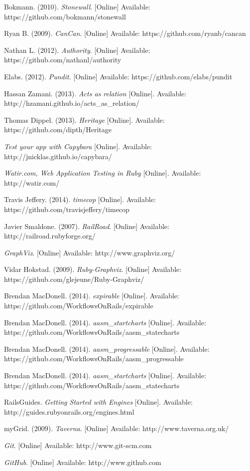 \begin{thebibliography}{99}
Bokmann. (2010). \textit{Stonewall}. [Online] Available: https://github.com/bokmann/stonewall

Ryan B. (2009). \textit{CanCan}. [Online] Available: https://github.com/ryanb/cancan

Nathan L. (2012). \textit{Authority}. [Online] Available: https://github.com/nathanl/authority

Elabs. (2012). \textit{Pundit}. [Online] Available: https://github.com/elabs/pundit

Hassan Zamani. (2013). \textit{Acts as relation} [Online]. Available: http://hzamani.github.io/acts\_as\_relation/

Thomas Dippel. (2013). \textit{Heritage} [Online]. Available: https://github.com/dipth/Heritage

\textit{Test your app with Capybara} [Online]. Available: http://jnicklas.github.io/capybara/

\textit{Watir.com, Web Application Testing in Ruby} [Online]. Available: http://watir.com/

Travis Jeffery. (2014). \textit{timecop} [Online]. Available: https://github.com/travisjeffery/timecop

Javier Smaldone. (2007). \textit{RailRoad}. [Online] Available: http://railroad.rubyforge.org/

\textit{GraphViz}. [Online] Available: http://www.graphviz.org/

Vidar Hokstad. (2009). \textit{Ruby-Graphviz}. [Online] Available: https://github.com/glejeune/Ruby-Graphviz/

Brendan MacDonell. (2014). \textit{expirable} [Online]. Available: https://github.com/WorkflowsOnRails/expirable

Brendan MacDonell. (2014). \textit{aasm\_startcharts} [Online]. Available: https://github.com/WorkflowsOnRails/aasm\_statecharts

Brendan MacDonell. (2014). \textit{aasm\_progressable} [Online]. Available: https://github.com/WorkflowsOnRails/aasm\_progressable

Brendan MacDonell. (2014). \textit{aasm\_startcharts} [Online]. Available: https://github.com/WorkflowsOnRails/aasm\_statecharts

RailsGuides. \textit{Getting Started with Engines} [Online]. Available: http://guides.rubyonrails.org/engines.html

myGrid. (2009). \textit{Taverna}. [Online] Available: http://www.taverna.org.uk/

\textit{Git}. [Online] Available: http://www.git-scm.com

\textit{GitHub}. [Online] Available: http://www.github.com

\end{thebibliography}

%    
%    


